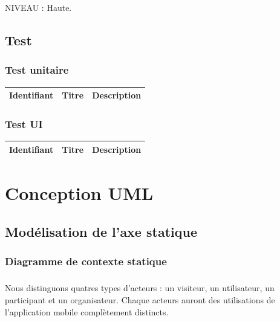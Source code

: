 \documentclass[titlepage, 12pt]{report}
\begin{document}
NIVEAU : Haute.

\section{Test}

\subsection{Test unitaire}

\begin{center}
	\begin{tabular}{|c|c|c|}
		\hline
		Identifiant & Titre & Description \\
		\hline \hline
	\end{tabular}
\end{center}

\subsection{Test UI}

\begin{center}
	\begin{tabular}{|c|c|c|}
		\hline
		Identifiant & Titre & Description \\
		\hline \hline
	\end{tabular}
\end{center}

\chapter{Conception UML}

\section{Modélisation de l'axe statique}

\subsection{Diagramme de contexte statique}

\paragraph{}Nous distinguons quatres types d'acteurs : un visiteur, un utilisateur, un participant et un organisateur. Chaque acteurs auront des utilisations de l'application mobile complètement distincts. 
\end{document}
